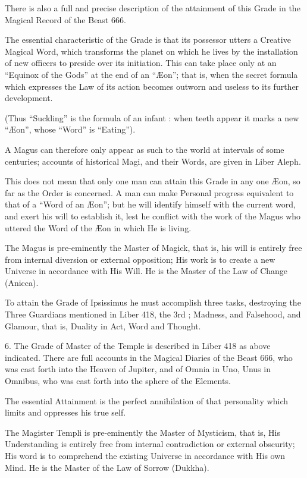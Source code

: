 There is also a full and precise description of the attainment of this Grade in the Magical Record of the Beast 666.

The essential characteristic of the Grade is that its possessor utters a Creative Magical Word, which transforms the planet on which he lives by the installation of new officers to preside over its initiation. This can take place only at an \enquote{Equinox of the Gods} at the end of an \enquote{\AE{}on}; that is, when the secret formula which expresses the Law of its action becomes outworn and useless to its further development.

(Thus \enquote{Suckling} is the formula of an infant : when teeth appear it marks a new \enquote{\AE{}on}, whose \enquote{Word} is \enquote{Eating}).

A Magus can therefore only appear as such to the world at intervals of some centuries; accounts of historical Magi, and their Words, are given in Liber Aleph.

This does not mean that only one man can attain this Grade in any one \AE{}on, so far as the Order is concerned. A man can make Personal progress equivalent to that of a \enquote{Word of an \AE{}on}; but he will identify himself with the current word, and exert his will to establish it, lest he conflict with the work of the Magus who uttered the Word of the \AE{}on in which He is living.

The Magus is pre-eminently the Master of Magick, that is, his will is entirely free from internal diversion or external opposition; His work is to create a new Universe in accordance with His Will. He is the Master of the Law of Change (Anicca).

To attain the Grade of Ipsissimus he must accomplish three tasks, destroying the Three Guardians mentioned in Liber 418, the 3rd \AEthyr{}; Madness, and Falsehood, and Glamour, that is, Duality in Act, Word and Thought.

\vspace{\baselineskip}

6. The Grade of Master of the Temple is described in Liber 418 as above indicated. There are full accounts in the Magical Diaries of the Beast 666, who was cast forth into the Heaven of Jupiter, and of Omnia in Uno, Unus in Omnibus, who was cast forth into the sphere of the Elements.

The essential Attainment is the perfect annihilation of that personality which limits and oppresses his true self.

The Magister Templi is pre-eminently the Master of Mysticism, that is, His Understanding is entirely free from internal contradiction or external obscurity; His word is to comprehend the existing Universe in accordance with His own Mind. He is the Master of the Law of Sorrow (Dukkha).

